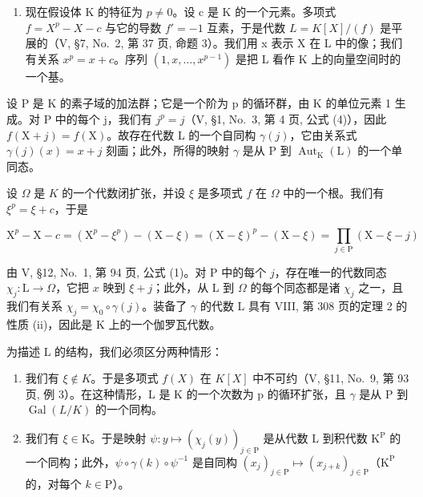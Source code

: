 \begin{enumerate}
\def\labelenumi{\arabic{enumi})}
\setcounter{enumi}{1}
\tightlist
\item
  现在假设体 K 的特征为 \(p \neq 0\)。设 c 是 K 的一个元素。多项式 \(f = X^{p} - X - c\) 与它的导数 \(f' = -1\) 互素，于是代数 \(L = K[X]/(f)\) 是平展的（V, §7, No.~2, 第 37 页, 命题 3）。我们用 x 表示 X 在 L 中的像；我们有关系 \(x^{p} = x + c\)。序列 \((1, x, \ldots, x^{p-1})\) 是把 L 看作 K 上的向量空间时的一个基。
\end{enumerate}

设 P 是 K 的素子域的加法群；它是一个阶为 p 的循环群，由 K 的单位元素 1 生成。对 P 中的每个 j，我们有 \(j^{p} = j\)（V, §1, No.~3, 第 4 页, 公式 (4)），因此 \(f(\mathrm{X} + j) = f(\mathrm{X})\)。故存在代数 L 的一个自同构 \(\gamma(j)\)，它由关系式 \(\gamma(j)(x) = x + j\) 刻画；此外，所得的映射 \(\gamma\) 是从 P 到 \(\operatorname{Aut}_{\mathrm{K}}(\mathrm{L})\) 的一个单同态。

设 \(\Omega\) 是 \(K\) 的一个代数闭扩张，并设 \(\xi\) 是多项式 \(f\) 在 \(\Omega\) 中的一个根。我们有 \(\xi^p = \xi + c\)，于是

\[
\mathrm{X} ^ {p} - \mathrm{X} - c = (\mathrm{X} ^ {p} - \xi^ {p}) - (\mathrm{X} - \xi) = (\mathrm{X} - \xi) ^ {p} - (\mathrm{X} - \xi) = \prod_ {j \in \mathrm{P}} (\mathrm{X} - \xi - j)
\]

由 V, §12, No.~1, 第 94 页, 公式 (1)。对 P 中的每个 \(j\)，存在唯一的代数同态 \(\chi_j: \mathrm{L} \to \Omega\)，它把 \(x\) 映到 \(\xi + j\)；此外，从 L 到 \(\Omega\) 的每个同态都是诸 \(\chi_j\) 之一，且我们有关系 \(\chi_{j}=\chi_{0}\circ\gamma(j)\)。装备了 \(\gamma\) 的代数 L 具有 VIII, 第 308 页的定理 2 的性质 (ii)，因此是 K 上的一个伽罗瓦代数。

为描述 L 的结构，我们必须区分两种情形：

\begin{enumerate}
\def\labelenumi{\alph{enumi})}
\item
  我们有 \(\xi\notin K\)。于是多项式 \(f(X)\) 在 \(K[X]\) 中不可约（V, §11, No.~9, 第 93 页, 例 3）。在这种情形，L 是 K 的一个次数为 p 的循环扩张，且 \(\gamma\) 是从 P 到 \(\operatorname{Gal}(L/K)\) 的一个同构。
\item
  我们有 \(\xi \in \mathrm{K}\)。于是映射 \(\psi : y \mapsto (\chi_j(y))_{j \in \mathrm{P}}\) 是从代数 \(\mathrm{L}\) 到积代数 \(\mathrm{K}^{\mathrm{P}}\) 的一个同构；此外，\(\psi \circ \gamma(k) \circ \psi^{-1}\) 是自同构 \((x_j)_{j \in \mathrm{P}} \mapsto (x_{j+k})_{j \in \mathrm{P}}\)（\(\mathrm{K}^{\mathrm{P}}\) 的，对每个 \(k \in \mathrm{P}\)）。
\end{enumerate}

